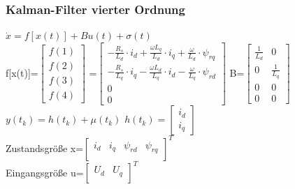 \documentclass[serif,11pt, xcolor=table]{beamer}
\begin{document}
\begin{frame}
	\frametitle{Kalman-Filter vierter Ordnung}
	
	$\Dot{x}=f[x(t)]+Bu(t)+\sigma(t)$\\
	\vskip 0.2cm
	f[x(t)]=$\begin{bmatrix}
		f(1)\\
		f(2)\\
		f(3)\\
		f(4)
	\end{bmatrix}$
	=$\begin{bmatrix}
		-\frac{R_{s}}{L_{d}}\cdot i_{d}+\frac{\omega L_{q}}{L_{d}}\cdot i_{q}+\frac{\omega}{L_{d}}\cdot \psi_{rq}\\
		-\frac{R_{s}}{L_{q}}\cdot i_{q}-\frac{\omega L_{d}}{L_{q}}\cdot i_{d}-\frac{\omega}{L_{q}}\cdot \psi_{rd}\\
		0\\
		0
	\end{bmatrix}$
	B=$\begin{bmatrix}
		\frac{1}{L_{d}} & 0\\
		0 &\frac{1}{L_{q}}\\
		0 &0\\
		0 &0
	\end{bmatrix}$
	$y(t_{k})=h(t_{k})+\mu(t_{k})$
	\vskip 0.2cm
	$h(t_{k})=\begin{bmatrix}
		i_{d}\\
		i_{q}
	\end{bmatrix}$\\
	
	Zustandsgrö{\ss}e x=$\begin{bmatrix}
		
		i_{d}&i_{q}&\psi_{rd}&\psi_{rq}\\
		
	\end{bmatrix}^T$\\
	Eingangsgrö{\ss}e  u=$\begin{bmatrix}
		
		U_{d}&U_{q}\\
		
	\end{bmatrix}^T$
	
\end{frame}
\end{document}
